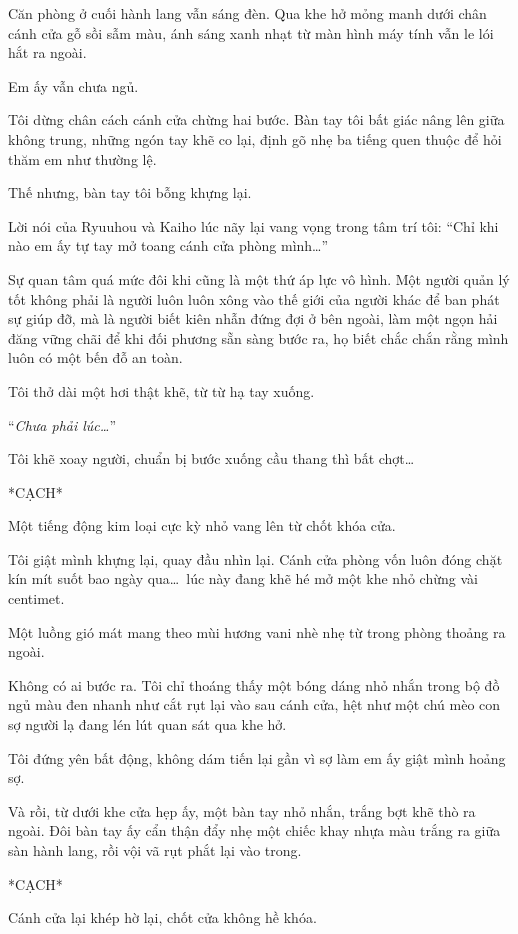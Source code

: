 \documentclass[../main.tex]{subfiles}
\begin{document}
Căn phòng ở cuối hành lang vẫn sáng đèn. Qua khe hở mỏng manh dưới chân cánh cửa gỗ sồi sẫm màu, ánh sáng xanh nhạt từ màn hình máy tính vẫn le lói hắt ra ngoài.

Em ấy vẫn chưa ngủ.

Tôi dừng chân cách cánh cửa chừng hai bước. Bàn tay tôi bất giác nâng lên giữa không trung, những ngón tay khẽ co lại, định gõ nhẹ ba tiếng quen thuộc để hỏi thăm em như thường lệ.

Thế nhưng, bàn tay tôi bỗng khựng lại.

Lời nói của Ryuuhou và Kaiho lúc nãy lại vang vọng trong tâm trí tôi: ``Chỉ khi nào em ấy tự tay mở toang cánh cửa phòng mình\dots''

Sự quan tâm quá mức đôi khi cũng là một thứ áp lực vô hình. Một người quản lý tốt không phải là người luôn luôn xông vào thế giới của người khác để ban phát sự giúp đỡ, mà là người biết kiên nhẫn đứng đợi ở bên ngoài, làm một ngọn hải đăng vững chãi để khi đối phương sẵn sàng bước ra, họ biết chắc chắn rằng mình luôn có một bến đỗ an toàn.

Tôi thở dài một hơi thật khẽ, từ từ hạ tay xuống.

``\textit{Chưa phải lúc\dots}''

Tôi khẽ xoay người, chuẩn bị bước xuống cầu thang thì bất chợt\dots

*CẠCH*

Một tiếng động kim loại cực kỳ nhỏ vang lên từ chốt khóa cửa.

Tôi giật mình khựng lại, quay đầu nhìn lại. Cánh cửa phòng vốn luôn đóng chặt kín mít suốt bao ngày qua\dots\ lúc này đang khẽ hé mở một khe nhỏ chừng vài centimet.

Một luồng gió mát mang theo mùi hương vani nhè nhẹ từ trong phòng thoảng ra ngoài.

Không có ai bước ra. Tôi chỉ thoáng thấy một bóng dáng nhỏ nhắn trong bộ đồ ngủ màu đen nhanh như cắt rụt lại vào sau cánh cửa, hệt như một chú mèo con sợ người lạ đang lén lút quan sát qua khe hở.

Tôi đứng yên bất động, không dám tiến lại gần vì sợ làm em ấy giật mình hoảng sợ.

Và rồi, từ dưới khe cửa hẹp ấy, một bàn tay nhỏ nhắn, trắng bợt khẽ thò ra ngoài. Đôi bàn tay ấy cẩn thận đẩy nhẹ một chiếc khay nhựa màu trắng ra giữa sàn hành lang, rồi vội vã rụt phắt lại vào trong.

*CẠCH*

Cánh cửa lại khép hờ lại, chốt cửa không hề khóa.
\end{document}

